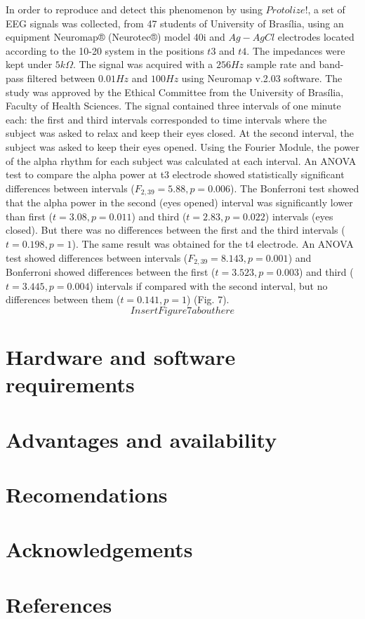 \documentclass[12pt, a4paper]{article}
\begin{document}
In order to reproduce and detect this phenomenon by using $Protolize!$, a set of EEG signals was collected, from 47 students of University of Brasília, using an equipment Neuromap® (Neurotec®) model 40i and $Ag-AgCl$ electrodes located according to the 10-20 system in the positions $t3$ and $t4$. The impedances were kept under $5k\Omega$. The signal was acquired with a $256 Hz$ sample rate and band-pass filtered between $0.01 Hz$ and $100 Hz$ using Neuromap v.2.03 software. The study was approved by the Ethical Committee from the University of Brasília, Faculty of Health Sciences. The signal contained three intervals of one minute each: the first and third intervals corresponded to time intervals where the subject was asked to relax and keep their eyes closed. At the second interval, the subject was asked to keep their eyes opened. Using the Fourier Module, the power of the alpha rhythm for each subject was calculated at each interval.  An ANOVA test to compare the alpha power at t3 electrode showed statistically significant differences between intervals ($F_{2,39}=5.88, p=0.006$). The Bonferroni test showed that the alpha power in the second (eyes opened) interval was significantly lower than first ($t=3.08, p=0.011$) and third ($t=2.83, p=0.022$) intervals (eyes closed). But there was no differences between the first and the third intervals ($t=0.198, p=1$). The same result was obtained for the t4 electrode. An ANOVA test showed differences between intervals ($F_{2,39}=8.143, p=0.001$) and Bonferroni showed differences between the first  ($t=3.523, p=0.003$) and third ($t=3.445, p=0.004$) intervals if compared with the second interval, but no differences between them ($t=0.141, p=1$) (Fig. 7).
$$Insert Figure 7 about here$$

\section{Hardware and software requirements}

\section{Advantages and availability}

\section{Recomendations}

\section{Acknowledgements}

\section{References}
\end{document}
